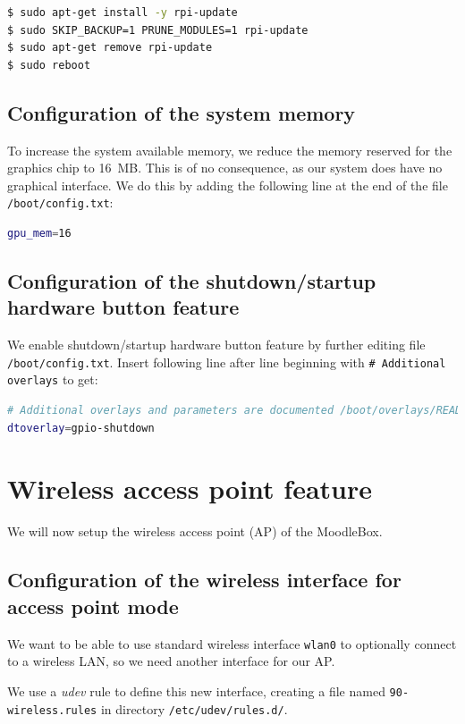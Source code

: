 \documentclass[12pt]{article}
\begin{document}
\begin{lstlisting}[language=bash]
$ sudo apt-get install -y rpi-update
$ sudo SKIP_BACKUP=1 PRUNE_MODULES=1 rpi-update
$ sudo apt-get remove rpi-update
$ sudo reboot
\end{lstlisting}

\subsection{Configuration of the system memory}

To increase the system available memory, we reduce the memory reserved for the graphics chip to 16~MB.
This is of no consequence, as our system does have no graphical interface.
We do this by adding the following line at the end of the file \lstinline{/boot/config.txt}:
\begin{lstlisting}[language=bash]
gpu_mem=16
\end{lstlisting}

\subsection{Configuration of the shutdown/startup hardware button feature}

We enable shutdown/startup hardware button feature by further editing file \lstinline{/boot/config.txt}.
Insert following line after line beginning with \lstinline{# Additional overlays} to get:
\begin{lstlisting}[language=bash]
# Additional overlays and parameters are documented /boot/overlays/README
dtoverlay=gpio-shutdown
\end{lstlisting}

\section{Wireless access point feature}

We will now setup the wireless access point (AP) of the MoodleBox.

\subsection{Configuration of the wireless interface for access point mode}

We want to be able to use standard wireless interface \lstinline{wlan0} to optionally connect to a wireless LAN, so we need another interface for our AP.

We use a \textsl{udev} rule to define this new interface, creating a file named \lstinline{90-wireless.rules} in directory \lstinline{/etc/udev/rules.d/}.
\end{document}
